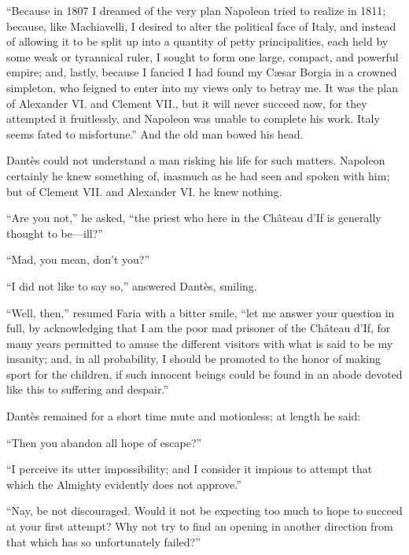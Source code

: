 “Because in 1807 I dreamed of the very plan Napoleon tried to realize
in 1811; because, like Machiavelli, I desired to alter the political
face of Italy, and instead of allowing it to be split up into a
quantity of petty principalities, each held by some weak or tyrannical
ruler, I sought to form one large, compact, and powerful empire; and,
lastly, because I fancied I had found my Cæsar Borgia in a crowned
simpleton, who feigned to enter into my views only to betray me. It was
the plan of Alexander VI. and Clement VII., but it will never succeed
now, for they attempted it fruitlessly, and Napoleon was unable to
complete his work. Italy seems fated to misfortune.” And the old man
bowed his head.

Dantès could not understand a man risking his life for such matters.
Napoleon certainly he knew something of, inasmuch as he had seen and
spoken with him; but of Clement VII. and Alexander VI. he knew nothing.

“Are you not,” he asked, “the priest who here in the Château d’If is
generally thought to be—ill?”

“Mad, you mean, don’t you?”

“I did not like to say so,” answered Dantès, smiling.

“Well, then,” resumed Faria with a bitter smile, “let me answer your
question in full, by acknowledging that I am the poor mad prisoner of
the Château d’If, for many years permitted to amuse the different
visitors with what is said to be my insanity; and, in all probability,
I should be promoted to the honor of making sport for the children, if
such innocent beings could be found in an abode devoted like this to
suffering and despair.”

Dantès remained for a short time mute and motionless; at length he
said:

“Then you abandon all hope of escape?”

“I perceive its utter impossibility; and I consider it impious to
attempt that which the Almighty evidently does not approve.”

“Nay, be not discouraged. Would it not be expecting too much to hope to
succeed at your first attempt? Why not try to find an opening in
another direction from that which has so unfortunately failed?”

